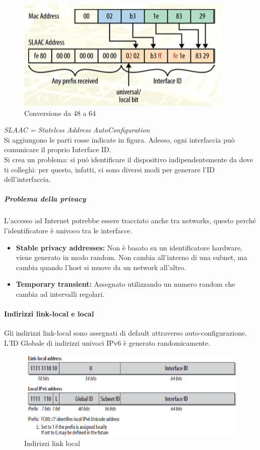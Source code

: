 \documentclass{article}
\begin{document}
\begin{figure}[H]
\centering
\includegraphics[scale=0.5]{figures/64-48 conversion.png}
\caption{Conversione da 48 a 64}
\end{figure}

\textit{SLAAC = Stateless Address AutoConfiguration} \\ Si aggiungono le parti rosse indicate in figura. Adesso, ogni interfaccia può comunicare il proprio Interface ID. \\ Si crea un problema: si può identificare il dispositivo indipendentemente da dove ti colleghi: per questo, infatti, ci sono diversi modi per generare l'ID dell'interfaccia. 

\subparagraph{Problema della privacy}  
L'accesso ad Internet potrebbe essere tracciato anche tra networks, questo perché l'identificatore è univoco tra le interfacce. 
\begin{itemize}
    \item \textbf{Stable privacy addresses:} Non è basato su un identificatore hardware, viene generato in modo random. Non cambia all'interno di una subnet, ma cambia quando l'host si muove da un network all'altro.
    \item \textbf{Temporary transient:} Assegnato utilizzando un numero random che cambia ad intervalli regolari.
\end{itemize}

\paragraph{Indirizzi link-local e local}
Gli indirizzi link-local sono assegnati di default attraverso auto-configurazione. L'ID Globale di indirizzi univoci IPv6 è generato randomicamente.

\begin{figure}[H]
\centering
\includegraphics[scale=0.5]{figures/linklocal.png}
\caption{Indirizzi link local}
\end{figure}
\end{document}
